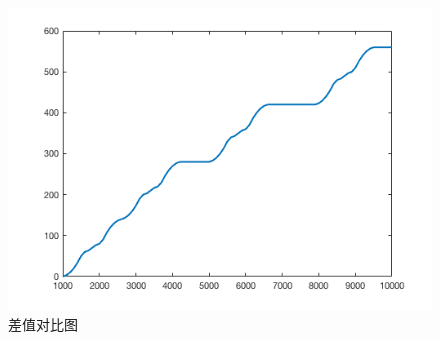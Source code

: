 \documentclass[twocolumn]{jbuaa}
\begin{document}
	\begin{figure}[!h]
	\centering
	\includegraphics[scale=0.4]{Figs/compare2.png}
	\caption{差值对比图}
	\label{fig:08}
	\end{figure}













	\renewcommand\refname{\hei\wuhao\centerline{参考文献（References）}\global\def\refname{参考文献}}
	\vskip 12pt

	\let\OLDthebibliography\thebibliography
	\renewcommand\thebibliography[1]{
		\OLDthebibliography{#1}
		\setlength{\parskip}{0pt}
		\setlength{\itemsep}{0pt plus 0.3ex}
	}

	{
		\renewcommand{\baselinestretch}{0.9}
		\liuhao
		
		
	}
  
\end{document}
